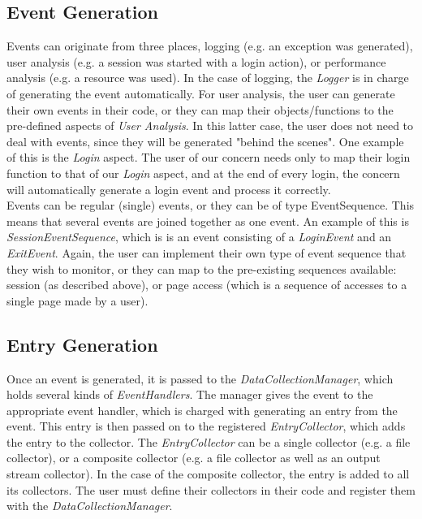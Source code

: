 \documentclass[paper=letter, fontsize=12pt]{scrartcl} %
\numberwithin{equation}{section} %
\numberwithin{figure}{section} %
\numberwithin{table}{section} %
\begin{document}
\subsection{Event Generation}

Events can originate from three places, logging (e.g. an exception was generated), user analysis (e.g. a session was started with a login action), or performance analysis (e.g. a resource was used). In the case of logging, the \textit{Logger} is in charge of generating the event automatically. For user analysis, the user can generate their own events in their code, or they can map their objects/functions to the pre-defined aspects of \textit{User Analysis}. In this latter case, the user does not need to deal with events, since they will be generated "behind the scenes". One example of this is the \textit{Login} aspect. The user of our concern needs only to map their login function to that of our \textit{Login} aspect, and at the end of every login, the concern will automatically generate a login event and process it correctly. \\
Events can be regular (single) events, or they can be of type EventSequence. This means that several events are joined together as one event. An example of this is \textit{SessionEventSequence}, which is is an event consisting of a \textit{LoginEvent} and an \textit{ExitEvent}. Again, the user can implement their own type of event sequence that they wish to monitor, or they can map to the pre-existing sequences available: session (as described above), or page access (which is a sequence of accesses to a single page made by a user).

\subsection{Entry Generation}

Once an event is generated, it is passed to the \textit{DataCollectionManager}, which holds several kinds of \textit{EventHandlers}. The manager gives the event to the appropriate event handler, which is charged with generating an entry from the event. This entry is then passed on to the registered \textit{EntryCollector}, which adds the entry to the collector. The \textit{EntryCollector} can be a single collector (e.g. a file collector), or a composite collector (e.g. a file collector as well as an output stream collector). In the case of the composite collector, the entry is added to all its collectors. The user must define their collectors in their code and register them with the \textit{DataCollectionManager}.
\end{document}
